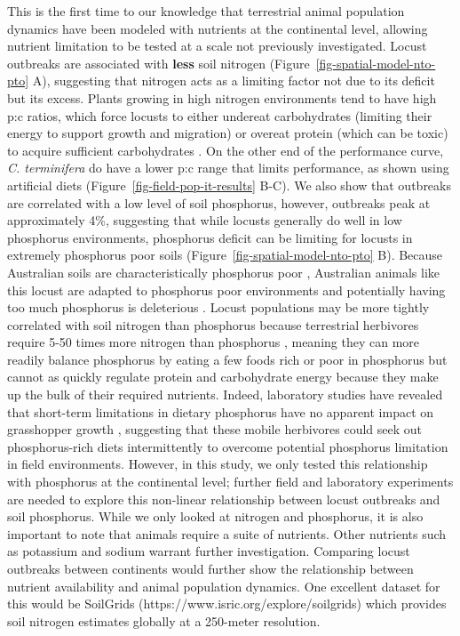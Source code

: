 \documentclass[
]{article}
\begin{document}
This is the first time to our knowledge that terrestrial animal
population dynamics have been modeled with nutrients at the continental
level, allowing nutrient limitation to be tested at a scale not
previously investigated. Locust outbreaks are associated with
\textbf{less} soil nitrogen (Figure~\ref{fig-spatial-model-nto-pto} A),
suggesting that nitrogen acts as a limiting factor not due to its
deficit \citep{white_inadequate_1993} but its excess. Plants growing in
high nitrogen environments tend to have high p:c ratios, which force
locusts to either undereat carbohydrates (limiting their energy to
support growth and migration) or overeat protein (which can be toxic) to
acquire sufficient carbohydrates
\citep{behmer_insect_2009, cease_how_2024}. On the other end of the
performance curve, \emph{C. terminifera} do have a lower p:c range that
limits performance, as shown using artificial diets
(Figure~\ref{fig-field-pop-it-results} B-C). We also show that outbreaks
are correlated with a low level of soil phosphorus, however, outbreaks
peak at approximately 4\%, suggesting that while locusts generally do
well in low phosphorus environments, phosphorus deficit can be limiting
for locusts in extremely phosphorus poor soils
(Figure~\ref{fig-spatial-model-nto-pto} B). Because Australian soils are
characteristically phosphorus poor \citep{donald_colin_phosphorus_1964},
Australian animals like this locust are adapted to phosphorus poor
environments and potentially having too much phosphorus is deleterious
\citep{morton_fresh_2011}. Locust populations may be more tightly
correlated with soil nitrogen than phosphorus because terrestrial
herbivores require 5-50 times more nitrogen than phosphorus
\citep{elser_nutritional_2000}, meaning they can more readily balance
phosphorus by eating a few foods rich or poor in phosphorus but cannot
as quickly regulate protein and carbohydrate energy because they make up
the bulk of their required nutrients. Indeed, laboratory studies have
revealed that short-term limitations in dietary phosphorus have no
apparent impact on grasshopper growth \citep{cease_dietary_2016},
suggesting that these mobile herbivores could seek out phosphorus-rich
diets intermittently to overcome potential phosphorus limitation in
field environments. However, in this study, we only tested this
relationship with phosphorus at the continental level; further field and
laboratory experiments are needed to explore this non-linear
relationship between locust outbreaks and soil phosphorus. While we only
looked at nitrogen and phosphorus, it is also important to note that
animals require a suite of nutrients. Other nutrients such as potassium
and sodium \citep{joern_not_2012} warrant further investigation.
Comparing locust outbreaks between continents would further show the
relationship between nutrient availability and animal population
dynamics. One excellent dataset for this would be SoilGrids
(https://www.isric.org/explore/soilgrids) which provides soil nitrogen
estimates globally at a 250-meter resolution.
\end{document}
